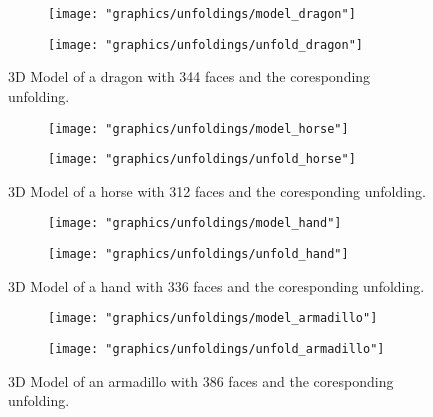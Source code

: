 \documentclass[draft,final]{vutinfth} %
\begin{document}
\begin{figure}
  \begin{subfigure}[b]{0.5\textwidth}
    \texttt{[image: "graphics/unfoldings/model\_dragon"]}
  \end{subfigure}
  \begin{subfigure}[b]{0.5\textwidth}
    \texttt{[image: "graphics/unfoldings/unfold\_dragon"]}
  \end{subfigure}
  
  \caption{3D Model of a dragon with 344 faces and the coresponding unfolding.}
  \label{fig:dragon}
\end{figure}

\begin{figure}
  \begin{subfigure}[b]{0.5\textwidth}
    \texttt{[image: "graphics/unfoldings/model\_horse"]}
  \end{subfigure}
  \begin{subfigure}[b]{0.5\textwidth}
    \texttt{[image: "graphics/unfoldings/unfold\_horse"]}
  \end{subfigure}
  
  \caption{3D Model of a horse with 312 faces and the coresponding unfolding.}
  \label{fig:horse}
\end{figure}

\begin{figure}
  \begin{subfigure}[b]{0.5\textwidth}
    \texttt{[image: "graphics/unfoldings/model\_hand"]}
  \end{subfigure}
  \begin{subfigure}[b]{0.5\textwidth}
    \texttt{[image: "graphics/unfoldings/unfold\_hand"]}
  \end{subfigure}
  
  \caption{3D Model of a hand with 336 faces and the coresponding unfolding.}
  \label{fig:hand}
\end{figure}

\begin{figure}
  \begin{subfigure}[b]{0.5\textwidth}
    \texttt{[image: "graphics/unfoldings/model\_armadillo"]}
  \end{subfigure}
  \begin{subfigure}[b]{0.5\textwidth}
    \texttt{[image: "graphics/unfoldings/unfold\_armadillo"]}
  \end{subfigure}
  
  \caption{3D Model of an armadillo with 386 faces and the coresponding unfolding.}
  \label{fig:armadillo}
\end{figure}
\end{document}
